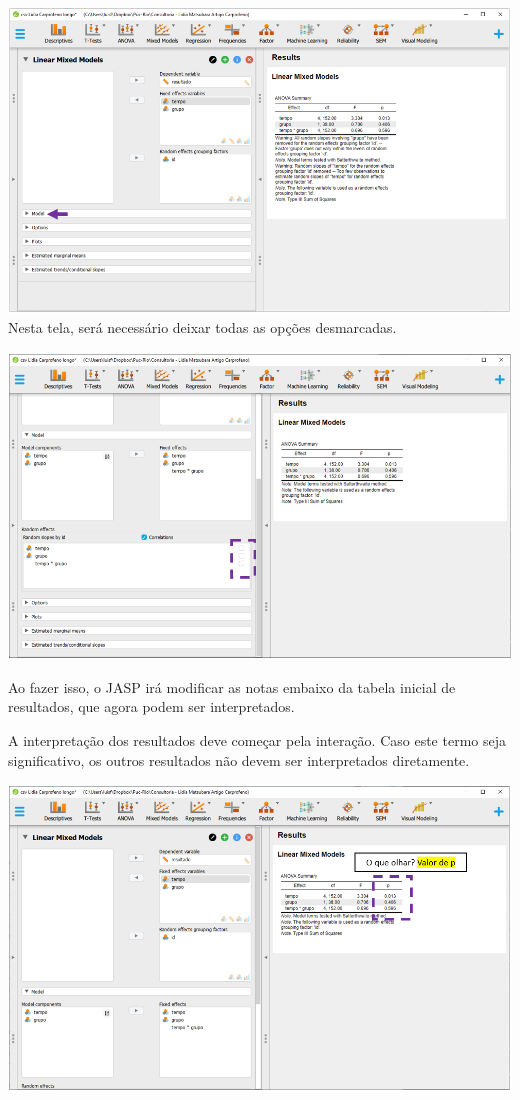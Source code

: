 \documentclass[
]{book}
\begin{document}
\includegraphics{./img/cap_lmm_model.png}
Nesta tela, será necessário deixar todas as opções desmarcadas.

\includegraphics{./img/cap_lmm_model2.png}

Ao fazer isso, o JASP irá modificar as notas embaixo da tabela inicial de resultados, que agora podem ser interpretados.

A interpretação dos resultados deve começar pela interação. Caso este termo seja significativo, os outros resultados não devem ser interpretados diretamente.

\includegraphics{./img/cap_lmm_resultados.png}
\end{document}

